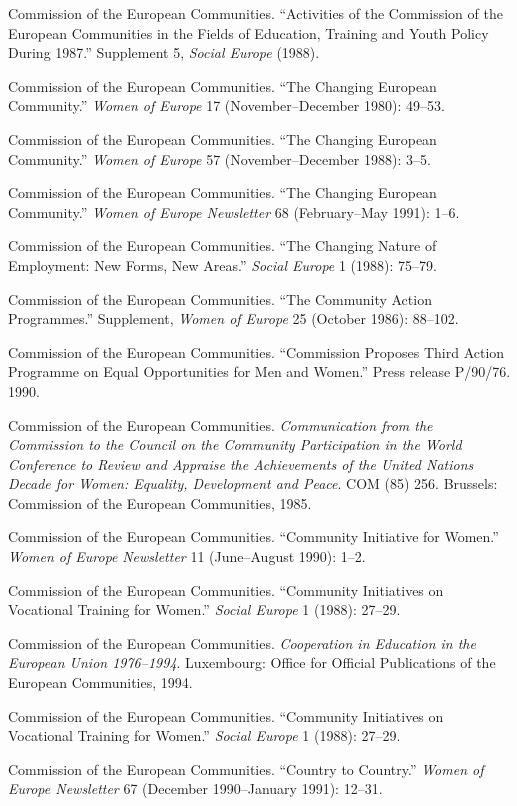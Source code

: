 \documentclass{tufte-handout}
\begin{document}
\begin{hangparas}{.25in}{1}
Commission of the European Communities. ``Activities of the Commission
of the European Communities in the Fields of Education, Training and
Youth Policy During 1987.'' Supplement 5, \emph{Social Europe} (1988).

Commission of the European Communities. ``The Changing European
Community.'' \emph{Women of Europe} 17 (November--December 1980):
49--53.

Commission of the European Communities. ``The Changing European
Community.'' \emph{Women of Europe} 57 (November--December 1988): 3--5.

Commission of the European Communities. ``The Changing European
Community.'' \emph{Women of Europe Newsletter} 68 (February--May 1991):
1--6.

Commission of the European Communities. ``The Changing Nature of
Employment: New Forms, New Areas.'' \emph{Social Europe} 1 (1988):
75--79.

Commission of the European Communities. ``The Community Action
Programmes.'' Supplement, \emph{Women of Europe} 25 (October 1986):
88--102.

Commission of the European Communities. ``Commission Proposes Third
Action Programme on Equal Opportunities for Men and Women.'' Press
release P/90/76. 1990.

Commission of the European Communities. \emph{Communication from the
Commission to the Council on the Community Participation in the World
Conference to Review and Appraise the Achievements of the United Nations
Decade for Women: Equality, Development and Peace}. COM (85) 256.
Brussels: Commission of the European Communities, 1985.

Commission of the European Communities. ``Community Initiative for
Women.'' \emph{Women of Europe} \emph{Newsletter} 11 (June--August
1990): 1--2.

Commission of the European Communities. ``Community Initiatives on
Vocational Training for Women.'' \emph{Social Europe} 1 (1988): 27--29.

Commission of the European Communities. \emph{Cooperation in Education
in the European Union 1976--1994}. Luxembourg: Office for Official
Publications of the European Communities, 1994.

Commission of the European Communities. ``Community Initiatives on
Vocational Training for Women.'' \emph{Social Europe} 1 (1988): 27--29.

Commission of the European Communities. ``Country to Country.''
\emph{Women of Europe Newsletter} 67 (December 1990--January 1991):
12--31.


\end{hangparas}
\end{document}
